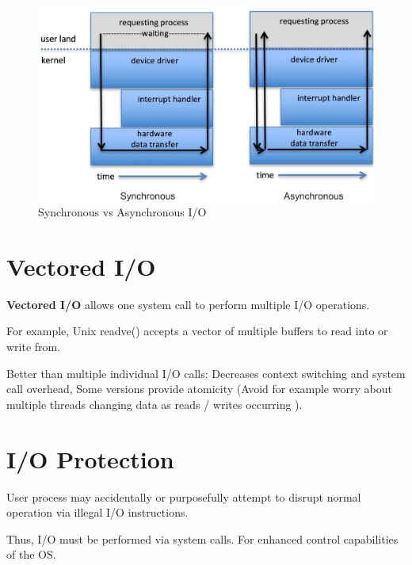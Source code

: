 \begin{figure}[h!]
    \centering
    \includegraphics[width=0.55\linewidth]{img/gj,hj,.png}
    \caption{Synchronous vs Asynchronous I/O}
\end{figure}

\section{Vectored I/O}

\textbf{Vectored I/O} allows one system call to perform multiple I/O
operations.

For example, Unix readve() accepts a vector of multiple
buffers to read into or write from.

Better than multiple individual I/O calls: Decreases context switching and system call overhead, Some versions provide atomicity (Avoid for example worry about multiple threads
changing data as reads / writes occurring ).


\section{I/O Protection}

User process may accidentally or purposefully attempt to
disrupt normal operation via illegal I/O instructions.

Thus, I/O must be performed via system calls. For enhanced control capabilities of the OS.


